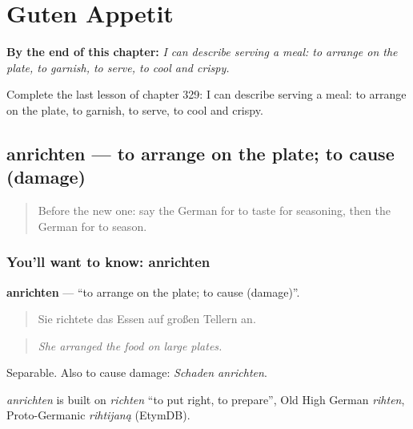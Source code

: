 
\chapter{Guten Appetit}
\label{ch:ge-guten-appetit}

\begin{chapteropening}
\textbf{By the end of this chapter:} \emph{I can describe serving a meal: to arrange on the plate, to garnish, to serve, to cool and crispy.}

Complete the last lesson of chapter 329: I can describe serving a meal: to arrange on the plate, to garnish, to serve, to cool and crispy.
\end{chapteropening}

\section[anrichten]{anrichten — to arrange on the plate; to cause (damage)}

\label{lesson:GE-C329-anrichten}



\begin{quote}
Before the new one: say the German for to taste for seasoning, then the German for to season.
\end{quote}

\subsection*{You'll want to know: anrichten}
\textbf{anrichten} — \textquotedblleft{}to arrange on the plate; to cause (damage)\textquotedblright{}.

\begin{quote}
Sie richtete das Essen auf großen Tellern an.
\end{quote}

\begin{quote}
\emph{She arranged the food on large plates.}
\end{quote}

Separable. Also to cause damage: \emph{Schaden anrichten}.

\begin{cousinweb}
\emph{anrichten} is built on \emph{richten} \textquotedblleft{}to put right, to prepare\textquotedblright{}, Old High German \emph{rihten}, Proto-Germanic \emph{rihtijaną} (EtymDB).
\end{cousinweb}

